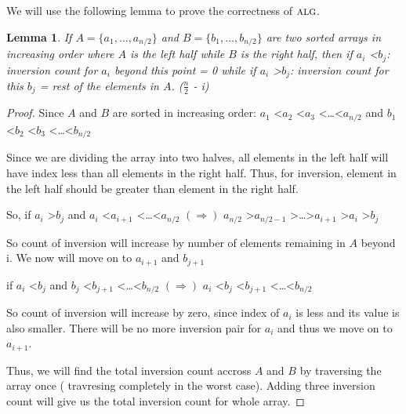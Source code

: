 \documentclass[11pt]{article}
\newcommand{\alg}{\textsc{alg}}
\newtheorem{lemma}[theorem]{Lemma}
\begin{document}
We will use the following lemma to prove the correctness of $\alg$.

\begin{lemma}\label{inversion-count-lemma}
If $A = \{a_1, \dots, a_{n/2}\}$ and $B = \{b_1, \dots, b_{n/2}\}$ are two sorted arrays in increasing order where
$A$ is the left half while $B$ is the right half, then \newline
if $a_i$ \textless $b_j$: inversion count for $a_i$ beyond this point = 0 \newline
while if $a_i$ \textgreater $b_j$: inversion count for this $b_j$ = rest of the elements in $A$. ($\frac{n}{2}$ - i)
\end{lemma}

\begin{proof}
Since $A$ and $B$ are sorted in increasing order: \newline
$a_1$ \textless $a_2$ \textless  $a_3$ \textless \dots \textless $a_{n/2}$ \newline
and  $b_1$ \textless $b_2$ \textless  $b_3$ \textless \dots \textless $b_{n/2}$ \newline

Since we are dividing the array into two halves, all elements in the left half will have index less than all elements in the right half.
Thus, for inversion, element in the left half should be greater than element in the right half. \newline

So, if $a_i$ \textgreater $b_j$ and $a_i$ \textless $a_{i+1}$ \textless \dots \textless $a_{n/2}$ \newline
  $(\Rightarrow)$ $a_{n/2}$ \textgreater $a_{n/2-1}$ \textgreater \dots \textgreater $a_{i+1}$ \textgreater $a_i$ \textgreater $b_j$ \newline

So count of inversion will increase by number of elements remaining in $A$ beyond i. We now will move on to $a_{i+1}$
and $b_{j+1}$

 if $a_i$ \textless $b_j$ and $b_j$ \textless $b_{j+1}$ \textless \dots \textless $b_{n/2}$  \newline
  $(\Rightarrow)$   $a_i$ \textless $b_j$ \textless $b_{j+1}$ \textless \dots \textless $b_{n/2}$ \newline

So count of inversion will increase by zero,  since index of $a_i$ is less and its value is also smaller. There will  be no more inversion
pair for $a_i$ and thus we move on to $a_{i+1}$.

Thus, we will find the total inversion count accross $A$ and $B$ by traversing the array once (
travresing completely in the worst case). \newline
Adding three inversion count will give us the total inversion count for whole array.
\end{proof}
\end{document}

